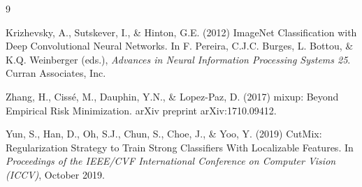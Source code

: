 \documentclass{article}
\begin{document}
\begin{thebibliography}{9}

Krizhevsky, A., Sutskever, I., \& Hinton, G.E. (2012) 
ImageNet Classification with Deep Convolutional Neural Networks. 
In F. Pereira, C.J.C. Burges, L. Bottou, \& K.Q. Weinberger (eds.), 
{\it Advances in Neural Information Processing Systems 25}. 
Curran Associates, Inc.

Zhang, H., Cissé, M., Dauphin, Y.N., \& Lopez-Paz, D. (2017) 
mixup: Beyond Empirical Risk Minimization. 
arXiv preprint arXiv:1710.09412.

Yun, S., Han, D., Oh, S.J., Chun, S., Choe, J., \& Yoo, Y. (2019) 
CutMix: Regularization Strategy to Train Strong Classifiers With Localizable Features. 
In {\it Proceedings of the IEEE/CVF International Conference on Computer Vision (ICCV)}, 
October 2019.

\end{thebibliography}
\end{document}
